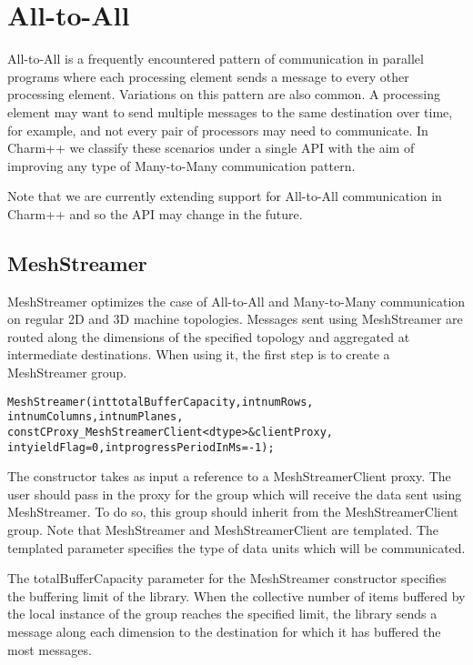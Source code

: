 \section{All-to-All}

All-to-All is a frequently encountered pattern of communication in
parallel programs where each processing element sends a message to
every other processing element. Variations on this pattern are also
common. A processing element may want to send multiple messages to the
same destination over time, for example, and not every pair of
processors may need to communicate. In Charm++ we classify these
scenarios under a single API with the aim of improving any type of
Many-to-Many communication pattern.

Note that we are currently extending support for All-to-All
communication in Charm++ and so the API may change in the
future. 

\subsection{MeshStreamer}

MeshStreamer optimizes the case of All-to-All and Many-to-Many
communication on regular 2D and 3D machine topologies. Messages sent
using MeshStreamer are routed along the dimensions of the specified
topology and aggregated at intermediate destinations. When using it,
the first step is to create a MeshStreamer group. 

\begin{alltt}
MeshStreamer(int totalBufferCapacity, int numRows, 
             int numColumns, int numPlanes, 
             const CProxy_MeshStreamerClient<dtype> &clientProxy,
             int yieldFlag = 0, int progressPeriodInMs = -1);
\end{alltt}

The constructor takes as input a reference to a MeshStreamerClient
proxy. The user should pass in the proxy for the group which will
receive the data sent using MeshStreamer. To do so, this group should
inherit from the MeshStreamerClient group. Note that MeshStreamer and
MeshStreamerClient are templated. The templated parameter specifies
the type of data units which will be communicated. 

The totalBufferCapacity parameter for the MeshStreamer constructor
specifies the buffering limit of the library. When the collective
number of items buffered by the local instance of the group reaches
the specified limit, the library sends a message along each dimension
to the destination for which it has buffered the most messages.

